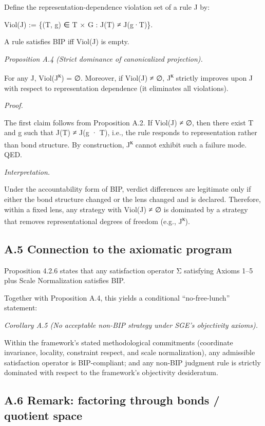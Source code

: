 \documentclass[12pt]{article}
\theoremstyle{plain}
\theoremstyle{definition}
\theoremstyle{remark}
\begin{document}
Define the representation-dependence violation set of a rule J by:

Viol(J) := \{(T, g) ∈ T × G : J(T) ≠ J(g·T)\}.

A rule satisfies BIP iff Viol(J) is empty.

\emph{Proposition A.4 (Strict dominance of canonicalized projection).}

For any J, Viol(J\textsuperscript{κ}) = ∅. Moreover, if Viol(J) ≠ ∅,
J\textsuperscript{κ} strictly improves upon J with respect to
representation dependence (it eliminates all violations).

\emph{Proof.}

The first claim follows from Proposition A.2. If Viol(J) ≠ ∅, then there
exist T and g such that J(T) ≠ J(g · T), i.e., the rule responds to
representation rather than bond structure. By construction,
J\textsuperscript{κ} cannot exhibit such a failure mode. QED.

\emph{Interpretation.}

Under the accountability form of BIP, verdict differences are legitimate
only if either the bond structure changed or the lens changed and is
declared. Therefore, within a fixed lens, any strategy with Viol(J) ≠ ∅
is dominated by a strategy that removes representational degrees of
freedom (e.g., J\textsuperscript{κ}).

\subsection{A.5 Connection to the axiomatic
program}\label{a.5-connection-to-the-axiomatic-program}

Proposition 4.2.6 states that any satisfaction operator Σ satisfying
Axioms 1--5 plus Scale Normalization satisfies BIP.

Together with Proposition A.4, this yields a conditional
``no-free-lunch'' statement:

\emph{Corollary A.5 (No acceptable non-BIP strategy under SGE's
objectivity axioms).}

Within the framework's stated methodological commitments (coordinate
invariance, locality, constraint respect, and scale normalization), any
admissible satisfaction operator is BIP-compliant; and any non-BIP
judgment rule is strictly dominated with respect to the framework's
objectivity desideratum.

\subsection{A.6 Remark: factoring through bonds / quotient
space}\label{a.6-remark-factoring-through-bonds-quotient-space}
\end{document}
